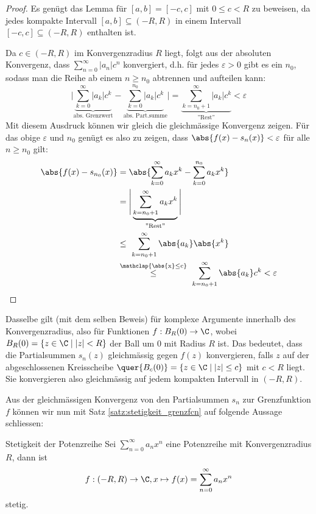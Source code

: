 \begin{proof}
Es genügt das Lemma für $[a,b] = [-c,c]$ mit $0\leq c < R$ zu beweisen, da jedes kompakte Intervall $[a,b] \subseteq (-R,R)$ in einem Intervall $[-c,c] \subseteq (-R,R)$ enthalten ist.

Da $c \in (-R,R)$ im Konvergenzradius $R$ liegt, folgt aus der absoluten Konvergenz, dass
$\sum_{n=0}^\infty |a_n| c^n$ konvergiert, d.h. für jedes $\varepsilon > 0$ gibt es ein $n_0$, sodass man die Reihe ab einem $n \geq n_0$ abtrennen und aufteilen kann:
$$\Big|\underbrace{\sum_{k=0}^\infty |a_k| c^k}_{\text{abs. Grenzwert}} - \underbrace{\sum_{k=0}^{n_0} |a_k| c^k}_{\text{abs. Part.summe}}\Big| = \underbrace{\sum_{k=n_0+1}^\infty |a_k| c^k}_{\text{''Rest''}} < \varepsilon$$
Mit diesem Ausdruck können wir gleich die gleichmässige Konvergenz zeigen. Für das obige $\varepsilon$ und $n_0$ genügt es also zu zeigen, dass $\abs{f(x) - s_n(x)} < \varepsilon$ für alle $n \geq n_0$ gilt:
\begin{align*}
    \abs{f(x) - s_{n_0}(x)} &= \abs{\sum_{k=0}^\infty a_k x^k - \sum_{k=0}^{n_0} a_k x^k}\\
                &= \Bigg|\underbrace{\sum_{k=n_0+1}^\infty a_k x^k}_{\text{''Rest''}}\Bigg|\\
                &\leq \ \sum_{k=n_0+1}^\infty\abs{a_k}\abs{x^k}\\
                &\stackrel{\mathclap{\mathrm{\abs{x}\leq c}}}{\leq} \ \sum_{k=n_0+1}^\infty \abs{a_k}c^k < \varepsilon
\end{align*}
\end{proof}

\begin{remark}
Dasselbe gilt (mit dem selben Beweis) für komplexe Argumente innerhalb des Konvergenzradius, also für Funktionen $f: B_R(0) \to \C$, wobei $B_R(0) = \{z \in \C \mid |z| < R\}$ der Ball um $0$ mit Radius $R$ ist. Das bedeutet, dass die Partialsummen $s_n(z)$ gleichmässig gegen $f(z)$ konvergieren, falls $z$ auf der abgeschlossenen Kreisscheibe $\quer{B_c(0)} = \{z \in \C \mid |z| \leq c\}$ mit $c<R$ liegt. Sie konvergieren also gleichmässig auf jedem kompakten Intervall in $(-R,R)$.
\end{remark}

Aus der gleichmässigen Konvergenz von den Partialsummen $s_n$ zur Grenzfunktion $f$ können wir nun mit Satz \ref{satz:stetigkeit_grenzfcn} auf folgende Aussage schliessen:

\begin{satz}{Stetigkeit der Potenzreihe}{}
Sei $\sum_{n=0}^\infty a_n x^n$ eine Potenzreihe mit Konvergenzradius $R$, dann ist
$$f: (-R, R) \to \C, x \mapsto f(x)= \sum_{n=0}^\infty a_n x^n$$ stetig.
\end{satz}

